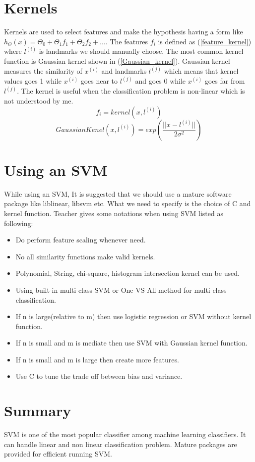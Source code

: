 \documentclass{article}
\begin{document}
\section {Kernels}
Kernels are used to select features and make the hypothesis having a form like $h_{\Theta}(x) = \Theta_{0} + \Theta_{1}f_{1} + \Theta_{2}f_{2} + \ldots$. The features $f_{i}$ is defined as (\ref{feature_kernel}) where $l^{(i)}$ is landmarks we should manually choose. The most common kernel function is Gaussian kernel shown in (\ref{Gaussian_kernel}). Gaussian kernel measures the similarity of $x^{(i)}$ and landmarks $l^{(j)}$ which means that kernel values goes 1 while $x^{(i)}$ goes near to $l^{(j)}$ and goes 0 while $x^{(i)}$ goes far from $l^{(j)}$. The kernel is useful when the classification problem is non-linear which is not understood by me.
\begin{equation}\label{feature_kernel}
f_{i} = kernel(x, l^{(i)})
\end{equation}
\begin{equation}\label{Gaussian_kernel}
GaussianKenel(x, l^{(i)}) = exp(\frac{||x-l^{(i)}||}{2\sigma^{2}})
\end{equation}

\section{Using an SVM}
While using an SVM, It is suggested that we should use a mature software package like liblinear, libsvm etc. What we need to specify is the choice of C and kernel function. Teacher gives some notations when using SVM listed as following:
\begin{itemize}
\item Do perform feature scaling whenever need.
\item No all similarity functions make valid kernels.
\item Polynomial, String, chi-square, histogram intersection kernel can be used.
\item Using built-in multi-class SVM or One-VS-All method for multi-class classification.
\item If n is large(relative to m) then use logistic regression or SVM without kernel function.
\item If n is small and m is mediate then use SVM with Gaussian kernel function.
\item If n is small and m is large then create more features.
\item Use C to tune the trade off between bias and variance.
\end{itemize}

\section{Summary}
SVM is one of the most popular classifier among machine learning classifiers. It can handle linear and non linear classification problem. Mature packages are provided for efficient running SVM.
\end{document}
